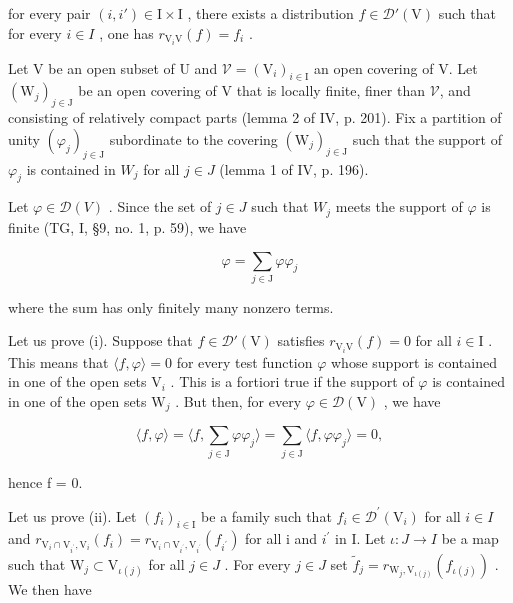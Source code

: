 for every pair \((i, i') \in \mathrm{I} \times \mathrm{I}\) , there exists a distribution \(f \in \mathcal{D}'(\mathrm{V})\) such that for every \(i \in I\) , one has \(r_{\mathrm{V}_{i}\mathrm{V}}(f) = f_{i}\) .

Let V be an open subset of U and \(\mathcal{V} = (\mathrm{V}_{i})_{i \in \mathrm{I}}\) an open covering of V. Let \((\mathrm{W}_{j})_{j \in \mathrm{J}}\) be an open covering of V that is locally finite, finer than \(\mathcal{V}\), and consisting of relatively compact parts (lemma 2 of IV, p. 201). Fix a partition of unity \((\varphi_{j})_{j \in \mathrm{J}}\) subordinate to the covering \((\mathrm{W}_{j})_{j \in \mathrm{J}}\) such that the support of \(\varphi_{j}\) is contained in \(W_{j}\) for all \(j \in J\) (lemma 1 of IV, p. 196).

Let \(\varphi\in\mathcal{D}(V)\) . Since the set of \(j\in J\) such that \(W_{j}\) meets the support of \(\varphi\) is finite (TG, I, §9, no. 1, p. 59), we have

\[
\varphi = \sum_ {j \in \mathrm{J}} \varphi \varphi_ {j}
\]

where the sum has only finitely many nonzero terms.

Let us prove (i). Suppose that \(f \in \mathcal{D}'(\mathrm{V})\) satisfies \(r_{\mathrm{V}_i\mathrm{V}}(f) = 0\) for all \(i \in \mathrm{I}\) . This means that \(\langle f, \varphi \rangle = 0\) for every test function \(\varphi\) whose support is contained in one of the open sets \(\mathrm{V}_i\) . This is a fortiori true if the support of \(\varphi\) is contained in one of the open sets \(\mathrm{W}_j\) . But then, for every \(\varphi \in \mathcal{D}(\mathrm{V})\) , we have

\[
\langle f, \varphi \rangle = \langle f, \sum_ {j \in \mathrm{J}} \varphi \varphi_ {j} \rangle = \sum_ {j \in \mathrm{J}} \langle f, \varphi \varphi_ {j} \rangle = 0,
\]

hence f = 0.

Let us prove (ii). Let \((f_{i})_{i\in\mathrm{I}}\) be a family such that \(f_{i}\in\mathcal{D}^{\prime}(\mathrm{V}_{i})\) for all \(i\in I\) and \(r_{\mathrm{V}_{i}\cap\mathrm{V}_{i^{\prime}},\mathrm{V}_{i}}(f_{i})=r_{\mathrm{V}_{i}\cap\mathrm{V}_{i^{\prime}},\mathrm{V}_{i^{\prime}}}(f_{i^{\prime}})\) for all i and \(i^{\prime}\) in I. Let \(\iota:J\to I\) be a map such that \(\mathrm{W}_{j}\subset\mathrm{V}_{\iota(j)}\) for all \(j\in J\) . For every \(j\in J\) set \(\widetilde{f}_{j}=r_{\mathrm{W}_{j},\mathrm{V}_{\iota(j)}}(f_{\iota(j)})\) . We then have

